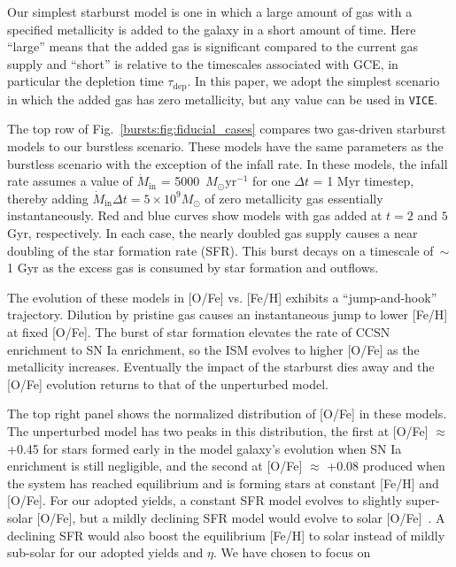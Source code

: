 Our simplest starburst model is one in which a large amount of gas with a 
specified metallicity is added to the galaxy in a short amount of time. Here 
``large'' means that the added gas is significant compared to the current gas 
supply and ``short'' is relative to the timescales associated with GCE, in 
particular the depletion time $\tau_\text{dep}$. In this paper, we adopt the 
simplest scenario in which the added gas has zero metallicity, but any value 
can be used in \texttt{VICE}. 
\par
The top row of Fig.~\ref{bursts:fig:fiducial_cases} compares two gas-driven 
starburst models to our burstless scenario. These models have the same 
parameters as the burstless scenario with the exception of the infall rate. In 
these models, the infall rate assumes a value of $\dot{M}_\text{in}$ = 5000\ 
$M_\odot \text{yr}^{-1}$ for one $\Delta t$ = 1 Myr timestep, thereby adding 
$\dot{M}_\text{in}\Delta t = 5\times10^9 M_\odot$ of zero metallicity gas 
essentially instantaneously. Red and blue curves show models with gas added at 
$t = 2$ and $5$ Gyr, respectively. In each case, the nearly doubled gas supply 
causes a near doubling of the star formation rate (SFR). This burst decays on 
a timescale of~$\sim$1 Gyr as the excess gas is consumed by star formation and 
outflows. 
\par
The evolution of these models in [O/Fe] vs. [Fe/H] exhibits a ``jump-and-hook'' 
trajectory. Dilution by pristine gas causes an instantaneous jump to lower 
[Fe/H] at fixed [O/Fe]. The burst of star formation elevates the rate of CCSN 
enrichment to SN Ia enrichment, so the ISM evolves to higher [O/Fe] as the 
metallicity increases. Eventually the impact of the starburst dies away and 
the [O/Fe] evolution returns to that of the unperturbed model. 
\par 
The top right panel shows the normalized distribution of [O/Fe] in these 
models. The unperturbed model has two peaks in this distribution, the first at 
[O/Fe] $\approx$ +0.45 for stars formed early in the model galaxy's evolution 
when SN Ia enrichment is still negligible, and the second at 
[O/Fe] $\approx$ +0.08 produced when the system has reached equilibrium and is 
forming stars at constant [Fe/H] and [O/Fe]. For our adopted yields, a constant 
SFR model evolves to slightly super-solar [O/Fe], but a mildly declining SFR 
model would evolve to solar [O/Fe]~\citep[see][figure 3]{Weinberg2017b}. A 
declining SFR would also boost the equilibrium [Fe/H] to solar instead of 
mildly sub-solar for our adopted yields and $\eta$. We have chosen to focus on 
